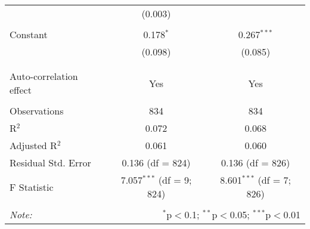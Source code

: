\begin{table}[!htbp]
\begin{tabular}{@{\extracolsep{5pt}}lcc}
  & (0.003) &  \\ 
  & & \\ 
 Constant & 0.178$^{*}$ & 0.267$^{***}$ \\ 
  & (0.098) & (0.085) \\ 
  & & \\ 
\hline \\[-1.8ex] 
Auto-correlation effect & Yes & Yes \\ 
\hline \\[-1.8ex] 
Observations & 834 & 834 \\ 
R$^{2}$ & 0.072 & 0.068 \\ 
Adjusted R$^{2}$ & 0.061 & 0.060 \\ 
Residual Std. Error & 0.136 (df = 824) & 0.136 (df = 826) \\ 
F Statistic & 7.057$^{***}$ (df = 9; 824) & 8.601$^{***}$ (df = 7; 826) \\ 
\hline 
\hline \\[-1.8ex] 
\textit{Note:}  & \multicolumn{2}{r}{$^{*}$p$<$0.1; $^{**}$p$<$0.05; $^{***}$p$<$0.01} \\ 
\end{tabular} 
\end{table} 
